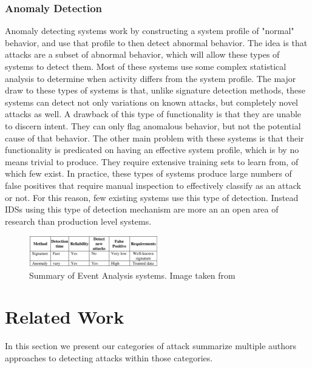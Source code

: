 \documentclass{acm_proc_article-sp}
\begin{document}
    	\subsubsection{Anomaly Detection}
    		Anomaly detecting systems work by constructing a system profile of "normal" behavior, and use that profile to then detect abnormal behavior. The idea is that attacks are a subset of abnormal behavior, which will allow these types of systems to detect them. Most of these systems use some complex statistical analysis to determine when activity differs from the system profile. The major draw to these types of systems is that, unlike signature detection methods, these systems can detect not only variations on known attacks, but completely novel attacks as well. A drawback of this type of functionality is that they are unable to discern intent. They can only flag anomalous behavior, but not the potential cause of that behavior. %
    		The other main problem with these systems is that their functionality is predicated on having an effective system profile, which is by no means trivial to produce. They require extensive training sets to learn from, of which few exist. In practice, these types of systems produce large numbers of false positives that require manual inspection to effectively classify as an attack or not. For this reason, few existing systems use this type of detection. Instead IDSs using this type of detection mechanism are more an an open area of research than production level systems. 
    	\begin{figure}[h!]
			\centering
			\includegraphics[width=0.5\textwidth]{signatreVSanomaly.png}
			\caption{Summary of Event Analysis systems. Image taken from \cite{Alenezi2012}}
			\label{comparison}
	\end{figure}
\section{Related Work}
    In this section we present our categories of attack summarize multiple authors approaches to detecting attacks within those categories.
    
\end{document}
